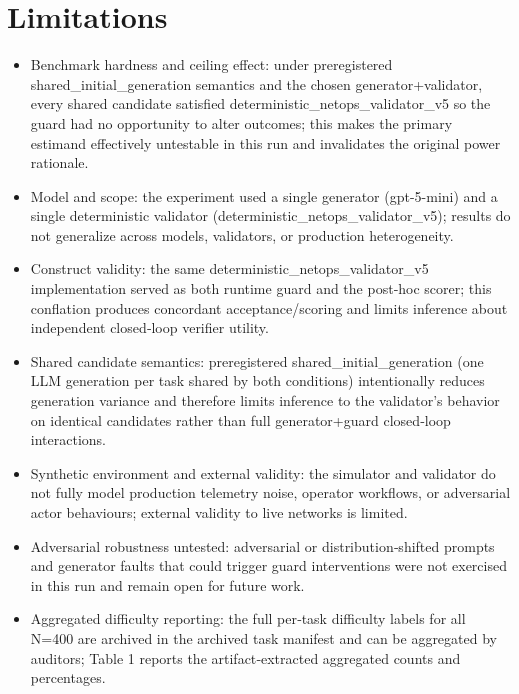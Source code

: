 \documentclass[conference]{IEEEtran}
\begin{document}
\section{Limitations}
\begin{itemize}
\item Benchmark hardness and ceiling effect: under preregistered shared\_initial\_generation semantics and the chosen generator+validator, every shared candidate satisfied deterministic\_netops\_validator\_v5 so the guard had no opportunity to alter outcomes; this makes the primary estimand effectively untestable in this run and invalidates the original power rationale.
\item Model and scope: the experiment used a single generator (gpt-5-mini) and a single deterministic validator (deterministic\_netops\_validator\_v5); results do not generalize across models, validators, or production heterogeneity.
\item Construct validity: the same deterministic\_netops\_validator\_v5 implementation served as both runtime guard and the post‑hoc scorer; this conflation produces concordant acceptance/scoring and limits inference about independent closed‑loop verifier utility.
\item Shared candidate semantics: preregistered shared\_initial\_generation (one LLM generation per task shared by both conditions) intentionally reduces generation variance and therefore limits inference to the validator's behavior on identical candidates rather than full generator+guard closed‑loop interactions.
\item Synthetic environment and external validity: the simulator and validator do not fully model production telemetry noise, operator workflows, or adversarial actor behaviours; external validity to live networks is limited.
\item Adversarial robustness untested: adversarial or distribution‑shifted prompts and generator faults that could trigger guard interventions were not exercised in this run and remain open for future work.
\item Aggregated difficulty reporting: the full per‑task difficulty labels for all N=400 are archived in the archived task manifest and can be aggregated by auditors; Table 1 reports the artifact‑extracted aggregated counts and percentages.
\end{itemize}
\end{document}
